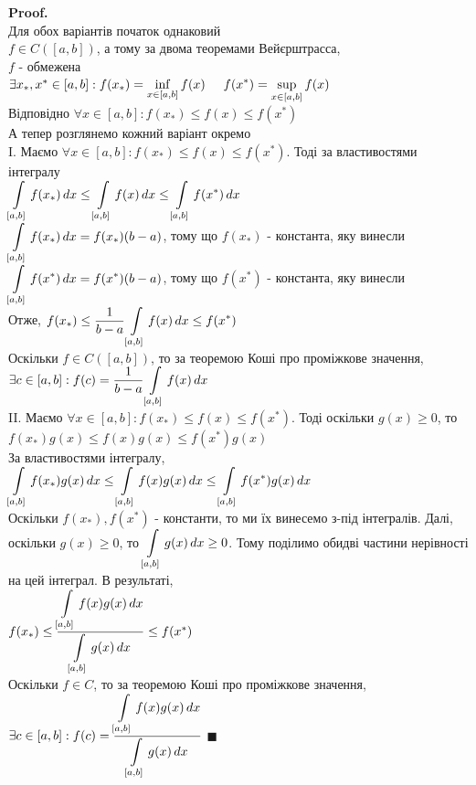 \documentclass[a4paper, 14pt]{extarticle}
\def\huge{\displaystyle}
\def\bigline{\vspace{5mm}\\}
\theoremstyle{theoremdd}
\theoremstyle{theoremdd}
\theoremstyle{theoremdd}
\theoremstyle{theoremdd}
\theoremstyle{theoremdd}
\theoremstyle{theoremdd}
\theoremstyle{theoremdd}
\theoremstyle{theoremdd}
\newenvironment{pf}{\vspace*{-3mm} \textbf{Proof. \\}}{$\blacksquare$}
\begin{document}
\begin{pf}
Для обох варіантів початок однаковий\\
$f \in C([a,b])$, а тому за двома теоремами Вейєрштрасса,\\
$f$ - обмежена\\
$\exists x_*, x^* \in [a,b]: f(x_*) = \huge\inf_{x \in [a,b]} f(x) \hspace{0.5cm} f(x^*) = \huge\sup_{x \in [a,b]} f(x)$\\
Відповідно $\forall x \in [a,b]: f(x_*) \leq f(x) \leq f(x^*)$\\
А тепер розглянемо кожний варіант окремо
\bigline
I. Маємо $\forall x \in [a,b]: f(x_*) \leq f(x) \leq f(x^*)$. Тоді за властивостями інтегралу\\
$\huge \int\displaylimits_{[a,b]} f(x_*)\,dx \leq \int\displaylimits_{[a,b]} f(x)\,dx \leq \int\displaylimits_{[a,b]} f(x^*)\,dx$\\
$\huge \int\displaylimits_{[a,b]} f(x_*)\,dx = f(x_*) (b-a)$, тому що $f(x_*)$ - константа, яку винесли\\
$\huge \int\displaylimits_{[a,b]} f(x^*)\,dx = f(x^*) (b-a)$, тому що $f(x^*)$ - константа, яку винесли\\
Отже,
$f(x_*) \leq \huge \dfrac{1}{b-a} \int\displaylimits_{[a,b]} f(x)\,dx \leq f(x^*)$\\
Оскільки $f \in C([a,b])$, то за теоремою Коші про проміжкове значення,\\
$\exists c \in [a,b]: f(c) = \dfrac{1}{b-a} \huge \int\displaylimits_{[a,b]} f(x)\,dx$
\bigline
II. Маємо $\forall x \in [a,b]: f(x_*) \leq f(x) \leq f(x^*)$. Тоді оскільки $g(x) \geq 0$, то\\
$f(x_*)g(x) \leq f(x)g(x) \leq f(x^*)g(x)$\\
За властивостями інтегралу,\\
$\huge \int\displaylimits_{[a,b]} f(x_*)g(x)\,dx \leq \int\displaylimits_{[a,b]} f(x)g(x)\,dx \leq \int\displaylimits_{[a,b]} f(x^*)g(x)\,dx$\\
Оскільки $f(x_*), f(x^*)$ - константи, то ми їх винесемо з-під інтегралів. Далі, оскільки $g(x) \geq 0$, то $\huge\int\displaylimits_{[a,b]} g(x)\,dx \geq 0$. Тому поділимо обидві частини нерівності на цей інтеграл. В результаті,\\
$f(x_*) \leq \dfrac{\huge \int\displaylimits_{[a,b]} f(x)g(x)\,dx}{\huge \int\displaylimits_{[a,b]} g(x)\,dx} \leq f(x^*)$\\
Оскільки $f \in C$, то за теоремою Коші про проміжкове значення,\\
$\exists c \in [a,b]: f(c) = \dfrac{\huge \int\displaylimits_{[a,b]} f(x)g(x)\,dx}{\huge \int\displaylimits_{[a,b]} g(x)\,dx}$
\end{pf}
\bigline
\end{document}
